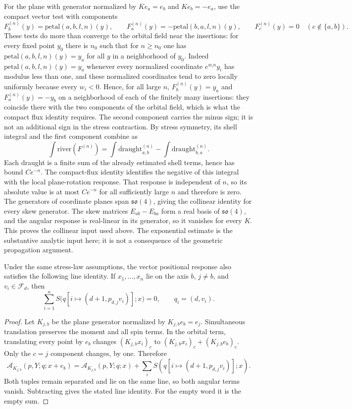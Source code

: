 For the plane with generator normalized by $K e_a=e_b$ and
$K e_b=-e_a$, use the compact
vector test with components
\[
 F_b^{(n)}(y)=\mathrm{petal}(a,b,l,n)(y),\qquad
 F_a^{(n)}(y)=-\mathrm{petal}(b,a,l,n)(y),\qquad
 F_c^{(n)}(y)=0\quad(c\notin\{a,b\}).
\]
These tests do more than converge to the orbital field near the
insertions: for every fixed point $y_0$ there is $n_0$ such that for
$n\ge n_0$ one has $\mathrm{petal}(a,b,l,n)(y)=y_a$ for all $y$ in a
neighborhood of $y_0$.  Indeed $\mathrm{petal}(a,b,l,n)(y)=y_a$ whenever
every normalized coordinate $e^{w_in}y_i$ has modulus less than one, and
these normalized coordinates tend to zero locally uniformly because every
$w_i<0$.  Hence, for all large $n$, $F_b^{(n)}(y)=y_a$ and
$F_a^{(n)}(y)=-y_b$ on a neighborhood of each of the finitely many
insertions: they coincide there with the two components of the orbital
field, which is what the compact flux identity requires.
The second component carries the minus sign; it is not an additional sign
in the stress contraction.  By stress symmetry, its shell integral and the
first component combine as
\[
 \int\mathrm{river}(F^{(n)})
 =\int\mathrm{draught}_{a,b}^{(n)}
  -\int\mathrm{draught}_{b,a}^{(n)}.
\]
Each draught is a finite sum of the already estimated shell terms, hence
has bound $C e^{-n}$.  The compact-flux identity identifies the negative of
this integral with the local plane-rotation response.  That response is
independent of $n$, so its absolute value is at most $C e^{-n}$ for all
sufficiently large $n$ and therefore is zero.  The generators of coordinate
planes span $\mathfrak{so}(4)$, giving the collinear identity for every
skew generator.
The skew matrices
$E_{ab}-E_{ba}$ form a real basis of $\mathfrak{so}(4)$, and the angular
response is real-linear in its generator, so it vanishes for every $K$.
This proves the collinear input used above.  The exponential estimate is
the substantive analytic input here; it is not a consequence of the
geometric propagation argument.

\begin{lemma}\label{lem:ward-outer-miles}
Under the same stress-law assumptions, the vector positional response also
satisfies the following line identity.  If $x_1,\ldots,x_n$ lie on the
axis $b$, $j\ne b$, and $v_i\in\mathcal F_d$, then
\[
 \sum_{i=1}^n S\bigl(q[i\mapsto(d+1,p_{d,j}v_i)];x\bigr)=0,
 \qquad q_i=(d,v_i).
\]
\end{lemma}

\begin{proof}
Let $K_{j,b}$ be the plane generator normalized by $K_{j,b}e_b=e_j$.
Simultaneous translation preserves the moment and all spin terms.  In the
orbital term, translating every point by $e_b$ changes $(K_{j,b}x_i)_c$
to $(K_{j,b}x_i)_c+(K_{j,b}e_b)_c$.  Only the $c=j$ component changes,
by one.  Therefore
\[
 \mathcal A_{K_{j,b}}(p,Y;q;x+e_b)=\mathcal A_{K_{j,b}}(p,Y;q;x)
   +\sum_i S(q[i\mapsto(d+1,p_{d,j}v_i)];x).
\]
Both tuples remain separated and lie on the same line, so both angular
terms vanish.  Subtracting gives the stated line identity.  For the empty
word it is the empty sum.
\end{proof}


